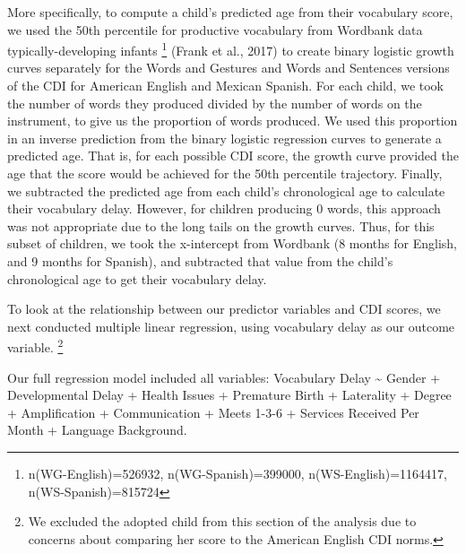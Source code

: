 \documentclass[
  english,
  man]{apa6}
\begin{document}
More specifically, to compute a child's predicted age from their vocabulary score, we used the 50th percentile for productive vocabulary from Wordbank data typically-developing infants \footnote{n(WG-English)=526932, n(WG-Spanish)=399000, n(WS-English)=1164417, n(WS-Spanish)=815724} (Frank et al., 2017) to create binary logistic growth curves separately for the Words and Gestures and Words and Sentences versions of the CDI for American English and Mexican Spanish. For each child, we took the number of words they produced divided by the number of words on the instrument, to give us the proportion of words produced. We used this proportion in an inverse prediction from the binary logistic regression curves to generate a predicted age. That is, for each possible CDI score, the growth curve provided the age that the score would be achieved for the 50th percentile trajectory. Finally, we subtracted the predicted age from each child's chronological age to calculate their vocabulary delay. However, for children producing 0 words, this approach was not appropriate due to the long tails on the growth curves. Thus, for this subset of children, we took the x-intercept from Wordbank (8 months for English, and 9 months for Spanish), and subtracted that value from the child's chronological age to get their vocabulary delay.

To look at the relationship between our predictor variables and CDI scores, we next conducted multiple linear regression, using vocabulary delay as our outcome variable. \footnote{We excluded the adopted child from this section of the analysis due to concerns about comparing her score to the American English CDI norms.}

Our full regression model included all variables: Vocabulary Delay \textasciitilde{} Gender + Developmental Delay + Health Issues + Premature Birth + Laterality + Degree + Amplification + Communication + Meets 1-3-6 + Services Received Per Month + Language Background.
\end{document}
